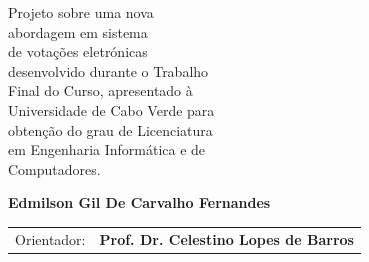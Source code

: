 \documentclass[a4paper,12pt]{report}
\begin{document}
\vspace{1.5cm}
\begin{flushright}
    Projeto sobre uma nova\\ 
    abordagem em sistema\\
    de votações eletrónicas \\
    desenvolvido durante o Trabalho\\
    Final do Curso, apresentado à\\
    Universidade de Cabo Verde para\\ 
    obtenção do grau de Licenciatura\\ 
    em Engenharia Informática e de\\
    Computadores.
\end{flushright}
\NoBgThispage
\begin{center}
    \vspace{1.5cm}
    {\large
        \textbf{Edmilson Gil De Carvalho Fernandes} \\
        \begin{tabular}{rl}
            {Orientador}: & \textbf{Prof. Dr. Celestino Lopes de Barros}
        \end{tabular}
    }
\end{center}

\newpage
\end{document}

